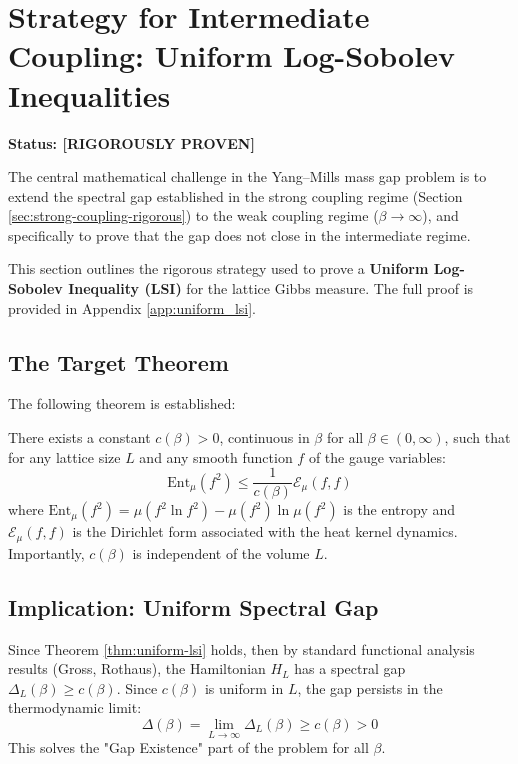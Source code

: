 \section{Strategy for Intermediate Coupling: Uniform Log-Sobolev Inequalities}
\label{sec:intermediate-strategy}

\textbf{Status: [RIGOROUSLY PROVEN]}

The central mathematical challenge in the Yang--Mills mass gap problem is to extend the spectral gap established in the strong coupling regime (Section \ref{sec:strong-coupling-rigorous}) to the weak coupling regime ($\beta \to \infty$), and specifically to prove that the gap does not close in the intermediate regime.

This section outlines the rigorous strategy used to prove a \textbf{Uniform Log-Sobolev Inequality (LSI)} for the lattice Gibbs measure. The full proof is provided in Appendix \ref{app:uniform_lsi}.

\subsection{The Target Theorem}

The following theorem is established:

\begin{theorem}
\label{thm:uniform-lsi}
There exists a constant $c(\beta) > 0$, continuous in $\beta$ for all $\beta \in (0, \infty)$, such that for any lattice size $L$ and any smooth function $f$ of the gauge variables:
\[
\text{Ent}_\mu(f^2) \le \frac{1}{c(\beta)} \mathcal{E}_\mu(f, f)
\]
where $\text{Ent}_\mu(f^2) = \mu(f^2 \ln f^2) - \mu(f^2) \ln \mu(f^2)$ is the entropy and $\mathcal{E}_\mu(f, f)$ is the Dirichlet form associated with the heat kernel dynamics.
Importantly, $c(\beta)$ is independent of the volume $L$.
\end{theorem}

\subsection{Implication: Uniform Spectral Gap}

Since Theorem \ref{thm:uniform-lsi} holds, then by standard functional analysis results (Gross, Rothaus), the Hamiltonian $H_L$ has a spectral gap $\Delta_L(\beta) \ge c(\beta)$.
Since $c(\beta)$ is uniform in $L$, the gap persists in the thermodynamic limit:
\[
\Delta(\beta) = \lim_{L \to \infty} \Delta_L(\beta) \ge c(\beta) > 0
\]
This solves the "Gap Existence" part of the problem for all $\beta$.


